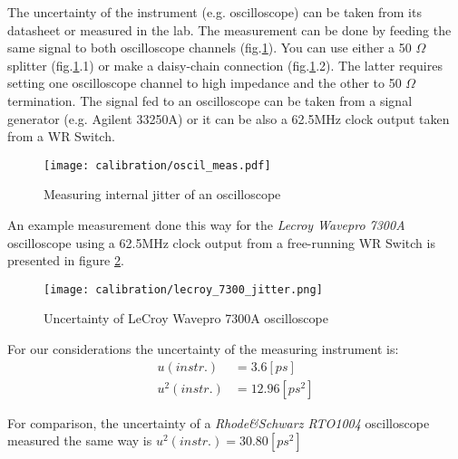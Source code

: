 The uncertainty of the instrument (e.g. oscilloscope) can be taken from
its datasheet or measured in the lab. The measurement can be done by feeding
the same signal to both oscilloscope channels (fig.\ref{fig:errors:osc_jitter}).
You can use either a 50 $\Omega$ splitter (fig.\ref{fig:errors:osc_jitter}.1) or
make a daisy-chain connection (fig.\ref{fig:errors:osc_jitter}.2). The
latter requires setting one oscilloscope channel to high impedance and the
other to 50 $\Omega$ termination. The signal fed to an oscilloscope can be taken
from a signal generator (e.g. Agilent 33250A) or it can be also a 62.5MHz clock
output taken from a WR Switch.
\begin{figure}[ht]
	\begin{center}
	\texttt{[image: calibration/oscil\_meas.pdf]}
	\caption{Measuring internal jitter of an oscilloscope}
	\label{fig:errors:osc_jitter}
	\end{center}
\end{figure}
An example measurement done this way for the \emph{Lecroy Wavepro 7300A}
oscilloscope using a 62.5MHz clock output from a free-running WR Switch is
presented in figure \ref{fig:errors:lecroy_jitter}.
\begin{figure}
	\begin{center}
	\texttt{[image: calibration/lecroy\_7300\_jitter.png]}
	\caption{Uncertainty of LeCroy Wavepro 7300A oscilloscope}
	\label{fig:errors:lecroy_jitter}
	\end{center}
\end{figure}
For our considerations the uncertainty of the measuring instrument is:
\begin{align}
	u(instr.) &= 3.6 [ps]\\
	\label{equ:errors:ulecroy}
  u^2(instr.) &= 12.96 [ps^2]
\end{align}

\noindent For comparison, the uncertainty of a \emph{Rhode\&Schwarz RTO1004}
oscilloscope measured the same way is $u^2(instr.) = 30.80 [ps^2]$\\

